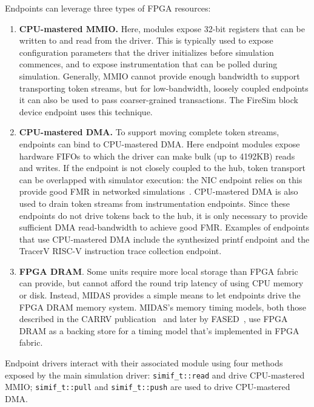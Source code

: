 Endpoints can leverage three types of FPGA resources:

\begin{enumerate}
\item \textbf{CPU-mastered MMIO.} Here, modules expose 32-bit registers that can be
    written to and read from the driver. This is typically used to expose
    configuration  parameters that the driver initializes before simulation
    commences, and to expose instrumentation that can be polled during
    simulation. Generally, MMIO cannot provide enough bandwidth to support transporting token streams,
    but for low-bandwidth, loosely coupled endpoints it can also be used to pass coarser-grained transactions.
    The FireSim block device endpoint uses this technique.

\item \textbf{CPU-mastered DMA.} To support moving complete token streams, endpoints can
    bind to CPU-mastered DMA. Here endpoint modules expose hardware FIFOs to which the driver
    can make bulk (up to 4192KB) reads and writes. If the endpoint is not closely coupled
    to the hub, token transport can be overlapped with simulator execution: the NIC endpoint relies on this
    provide good FMR in networked simulations~\cite{FireSim}. CPU-mastered DMA is also used 
    to drain token streams from instrumentation endpoints. Since these endpoints do not drive
    tokens back to the hub, it is only necessary to provide sufficient DMA
    read-bandwidth to achieve good FMR.
    Examples of endpoints that use CPU-mastered DMA include the synthesized printf endpoint and the TracerV
    RISC-V instruction trace collection endpoint.

\item \textbf{FPGA DRAM}. Some units require more local storage than FPGA fabric can
    provide, but cannot afford the round trip latency of using CPU memory or
    disk. Instead, MIDAS provides a simple means to let endpoints drive the FPGA
    DRAM memory system.  MIDAS's memory timing models, both those described
    in the CARRV publication~\cite{MIDAS} and later by FASED~\cite{FASED},
    use FPGA DRAM as a backing store for a timing model that's implemented
    in FPGA fabric.
\end{enumerate}

Endpoint drivers interact with their associated module using four methods
exposed by the main simulation driver: \texttt{simif\_t::read} and
 drive CPU-mastered MMIO; \texttt{simif\_t::pull} and
\texttt{simif\_t::push} are used to drive CPU-mastered DMA.

